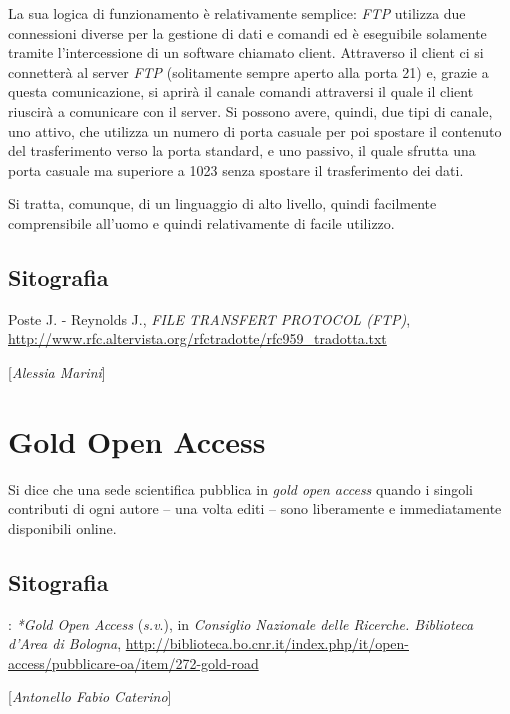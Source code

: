 {{La sua logica di funzionamento è relativamente semplice: \emph{FTP}
utilizza due connessioni diverse per la gestione di dati e comandi ed è
eseguibile solamente tramite l'intercessione di un software chiamato
client. Attraverso il client ci si connetterà al server \emph{FTP}
(solitamente sempre aperto alla porta 21) e, grazie a questa
comunicazione, si aprirà il canale comandi attraversi il quale il client
riuscirà a comunicare con il server. Si possono avere, quindi, due tipi
di canale, uno attivo, che utilizza un numero di porta casuale per poi
spostare il contenuto del trasferimento verso la porta standard, e uno
passivo, il quale sfrutta una porta casuale ma superiore a 1023 senza
spostare il trasferimento dei dati.

Si tratta, comunque, di un linguaggio di alto livello, quindi facilmente
comprensibile all'uomo e quindi relativamente di facile utilizzo.

\section*{Sitografia}
{\parindent0pt 
Poste J. - Reynolds J., \emph{FILE TRANSFERT PROTOCOL (FTP)},
\url{http://www.rfc.altervista.org/rfctradotte/rfc959_tradotta.txt}

}

\hrulefill 

{[}\emph{Alessia Marini}{]}




\chapter{Gold Open Access}

Si dice che una sede scientifica pubblica in \emph{gold open access}
quando i singoli contributi di ogni autore -- una volta editi -- sono
liberamente e immediatamente disponibili online.

\section*{Sitografia}:
{\parindent0pt 
\emph{*Gold Open Access} (\emph{s.v}.), in \emph{Consiglio Nazionale
delle Ricerche. Biblioteca d'Area di Bologna},
\url{http://biblioteca.bo.cnr.it/index.php/it/open-access/pubblicare-oa/item/272-gold-road}
}

\hrulefill 

{[}\emph{Antonello Fabio Caterino}{]}



}}
